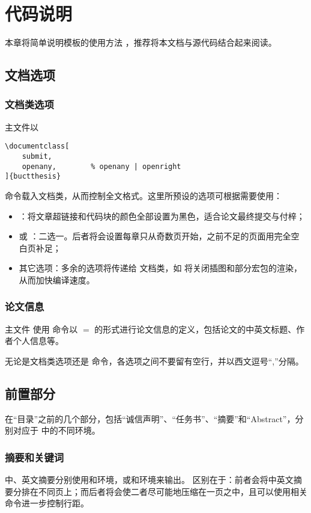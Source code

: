 \chapter{代码说明}\label{chap:CodeIntro}
本章将简单说明模板的使用方法 ，推荐将本文档与源代码结合起来阅读。

\section{文档选项}\label{sec:options}
\subsection{文档类选项}
主文件以
\begin{lstlisting}
\documentclass[
	submit,
	openany,		% openany | openright
]{buctthesis}
\end{lstlisting}
命令载入文档类，从而控制全文格式。这里所预设的选项可根据需要使用：
\begin{itemize}
	\item {}：将文章超链接和代码块的颜色全部设置为黑色，适合论文最终提交与付梓；
	\item {} 或 ：二选一。后者将会设置每章只从奇数页开始，之前不足的页面用完全空白页补足；
	\item 其它选项：多余的选项将传递给  文档类，如  将关闭插图和部分宏包的渲染，从而加快编译速度。
\end{itemize}
\subsection{论文信息}\label{subsec:buctsetup}
主文件  使用  命令以 $=$ 的形式进行论文信息的定义，包括论文的中英文标题、作者个人信息等。

无论是文档类选项还是  命令，各选项之间不要留有空行，并以西文逗号“,”分隔。

\section{前置部分}\label{sec:frontmatter}
在“目录”之前的几个部分，包括“诚信声明”、“任务书”、“摘要”和“Abstract”，分别对应于  中的不同环境。

\subsection{摘要和关键词}\label{subsec:abstract}
中、英文摘要分别使用和环境，或和环境来输出。
区别在于：前者会将中英文摘要分排在不同页上；而后者将会使二者尽可能地压缩在一页之中，且可以使用相关命令进一步控制行距。

